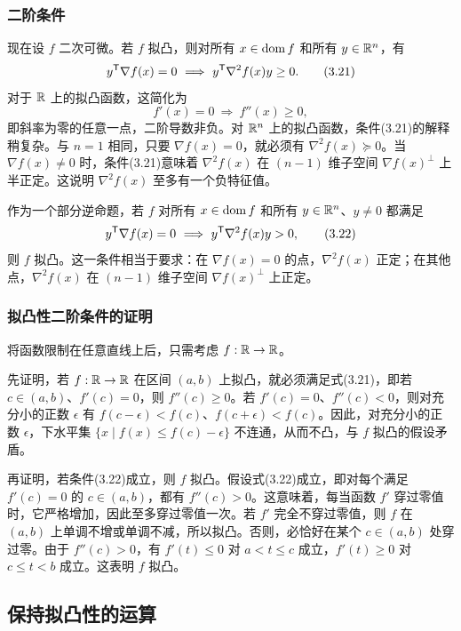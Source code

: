 \subsubsection*{二阶条件}
现在设 $f$ 二次可微。若 $f$ 拟凸，则对所有 $x\in\operatorname{dom} f$ 和所有 $y\in\mathbb R^n$，有
\begin{equation}y^\T\nabla f(x)=0\ \Longrightarrow\ y^\T\nabla^2f(x)y\geq0.\tag{3.21}\end{equation}
对于 $\mathbb R$ 上的拟凸函数，这简化为
\[f'(x)=0\ \Longrightarrow\ f''(x)\geq0,\]
即斜率为零的任意一点，二阶导数非负。对 $\mathbb R^n$ 上的拟凸函数，条件(3.21)的解释稍复杂。与 $n=1$ 相同，只要 $\nabla f(x)=0$，就必须有 $\nabla^2f(x)\succeq0$。当 $\nabla f(x)\ne0$ 时，条件(3.21)意味着 $\nabla^2f(x)$ 在 $(n-1)$ 维子空间 $\nabla f(x)^\perp$ 上半正定。这说明 $\nabla^2f(x)$ 至多有一个负特征值。

作为一个部分逆命题，若 $f$ 对所有 $x\in\operatorname{dom} f$ 和所有 $y\in\mathbb R^n$、$y\ne0$ 都满足
\begin{equation}y^\T\nabla f(x)=0\ \Longrightarrow\ y^\T\nabla^2f(x)y>0,\tag{3.22}\end{equation}
则 $f$ 拟凸。这一条件相当于要求：在 $\nabla f(x)=0$ 的点，$\nabla^2f(x)$ 正定；在其他点，$\nabla^2f(x)$ 在 $(n-1)$ 维子空间 $\nabla f(x)^\perp$ 上正定。
\subsubsection*{拟凸性二阶条件的证明}
将函数限制在任意直线上后，只需考虑 $f:\mathbb R\to\mathbb R$。

先证明，若 $f:\mathbb R\to\mathbb R$ 在区间 $(a,b)$ 上拟凸，就必须满足式(3.21)，即若 $c\in(a,b)$、$f'(c)=0$，则 $f''(c)\geq0$。若 $f'(c)=0$、$f''(c)<0$，则对充分小的正数 $\epsilon$ 有 $f(c-\epsilon)<f(c)$、$f(c+\epsilon)<f(c)$。因此，对充分小的正数 $\epsilon$，下水平集 $\{x\mid f(x)\leq f(c)-\epsilon\}$ 不连通，从而不凸，与 $f$ 拟凸的假设矛盾。

再证明，若条件(3.22)成立，则 $f$ 拟凸。假设式(3.22)成立，即对每个满足 $f'(c)=0$ 的 $c\in(a,b)$，都有 $f''(c)>0$。这意味着，每当函数 $f'$ 穿过零值时，它严格增加，因此至多穿过零值一次。若 $f'$ 完全不穿过零值，则 $f$ 在 $(a,b)$ 上单调不增或单调不减，所以拟凸。否则，必恰好在某个 $c\in(a,b)$ 处穿过零。由于 $f''(c)>0$，有 $f'(t)\leq0$ 对 $a<t\leq c$ 成立，$f'(t)\geq0$ 对 $c\leq t<b$ 成立。这表明 $f$ 拟凸。
\subsection{保持拟凸性的运算}
